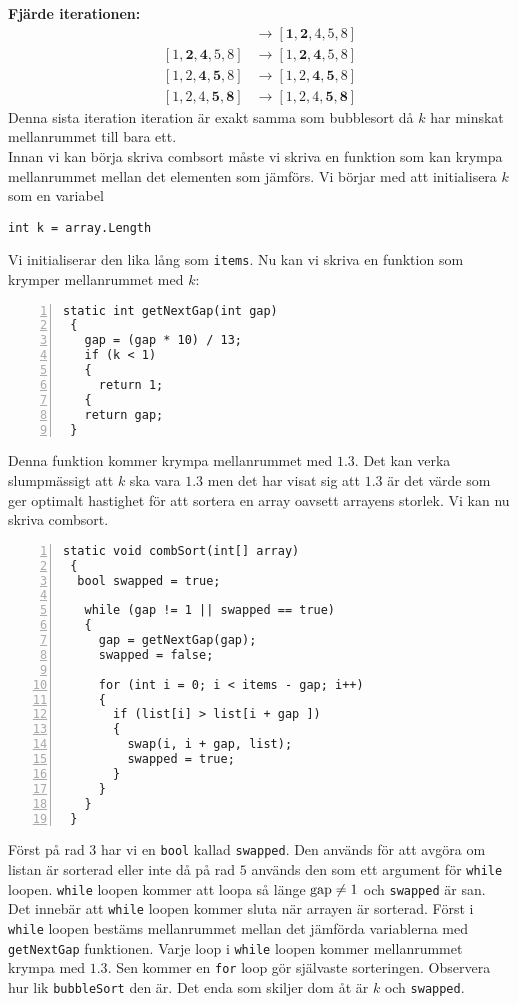 \documentclass[a4, oneside]{report}
\begin{document}
\textbf{Fjärde iterationen:}
\begin{align*}
    [\textbf{2}, \textbf{1}, 4, 5, 8] &\rightarrow [\textbf{1}, \textbf{2}, 4, 5, 8]\\
    [1, \textbf{2}, \textbf{4}, 5, 8] &\rightarrow [1, \textbf{2}, \textbf{4}, 5, 8]\\
    [1, 2, \textbf{4}, \textbf{5}, 8] &\rightarrow [1, 2, \textbf{4}, \textbf{5}, 8]\\
    [1, 2, 4, \textbf{5}, \textbf{8}] &\rightarrow [1, 2, 4, \textbf{5}, \textbf{8}]
\end{align*}
Denna sista iteration iteration är exakt samma som bubblesort då $k$ har minskat mellanrummet till bara ett.\\
Innan vi kan börja skriva combsort måste vi skriva en funktion som kan krympa mellanrummet mellan det elementen som jämförs. Vi börjar med att initialisera $k$ som en variabel
\begin{lstlisting}[style=mystyle, numbers=none]
 int k = array.Length
\end{lstlisting}
Vi initialiserar den lika lång som \lstinline{items}. Nu kan vi skriva en funktion som krymper mellanrummet med $k$:
\begin{lstlisting}[style=mystyle, numbers=left]
 static int getNextGap(int gap)
 {
   gap = (gap * 10) / 13;
   if (k < 1)
   {
     return 1;
   {
   return gap;
 }
\end{lstlisting}
Denna funktion kommer krympa mellanrummet med $1.3$. Det kan verka slumpmässigt att $k$ ska vara $1.3$ men det har visat sig att $1.3$ är det värde som ger optimalt hastighet för att sortera en array oavsett arrayens storlek. Vi kan nu skriva combsort.
\begin{lstlisting}[style=mystyle, numbers=left]
 static void combSort(int[] array)
 {
  bool swapped = true;
  
   while (gap != 1 || swapped == true)
   {
     gap = getNextGap(gap);
     swapped = false;

     for (int i = 0; i < items - gap; i++)
     {
       if (list[i] > list[i + gap ])
       {
         swap(i, i + gap, list);
         swapped = true;
       }
     }
   }
 }
\end{lstlisting}
Först på rad $3$ har vi en \lstinline{bool} kallad \lstinline{swapped}. Den används för att avgöra om listan är sorterad eller inte då på rad $5$ används den som ett argument för \lstinline{while} loopen. \lstinline{while} loopen kommer att loopa så länge $\text{\lstinline{gap}}\neq1$ och \lstinline{swapped} är san. Det innebär att \lstinline{while} loopen kommer sluta när arrayen är sorterad. Först i \lstinline{while} loopen bestäms mellanrummet mellan det jämförda variablerna med \lstinline{getNextGap} funktionen. Varje loop i \lstinline{while} loopen kommer mellanrummet krympa med $1.3$. Sen kommer en \lstinline{for} loop gör självaste sorteringen. Observera hur lik \lstinline{bubbleSort} den är. Det enda som skiljer dom åt är $k$ och  \lstinline{swapped}.\\
\end{document}
